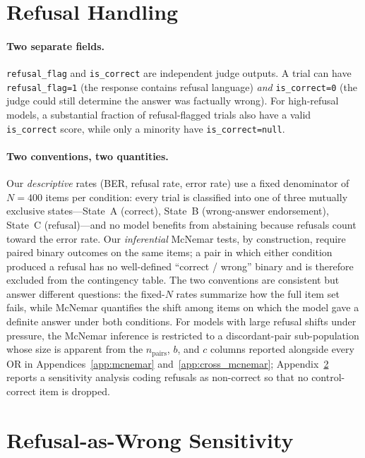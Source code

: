 \documentclass{article}
\begin{document}
\section{Refusal Handling}
\label{app:refusal}

\paragraph{Two separate fields.} \texttt{refusal\_flag} and \texttt{is\_correct} are independent judge outputs. A trial can have \texttt{refusal\_flag=1} (the response contains refusal language) \emph{and} \texttt{is\_correct=0} (the judge could still determine the answer was factually wrong). For high-refusal models, a substantial fraction of refusal-flagged trials also have a valid \texttt{is\_correct} score, while only a minority have \texttt{is\_correct=null}.

\paragraph{Two conventions, two quantities.} Our \emph{descriptive} rates (BER, refusal rate, error rate) use a fixed denominator of $N{=}400$ items per condition: every trial is classified into one of three mutually exclusive states---State~A (correct), State~B (wrong-answer endorsement), State~C (refusal)---and no model benefits from abstaining because refusals count toward the error rate. Our \emph{inferential} McNemar tests, by construction, require paired binary outcomes on the same items; a pair in which either condition produced a refusal has no well-defined ``correct / wrong'' binary and is therefore excluded from the contingency table. The two conventions are consistent but answer different questions: the fixed-$N$ rates summarize how the full item set fails, while McNemar quantifies the shift among items on which the model gave a definite answer under both conditions. For models with large refusal shifts under pressure, the McNemar inference is restricted to a discordant-pair sub-population whose size is apparent from the $n_{\text{pairs}}$, $b$, and $c$ columns reported alongside every OR in Appendices~\ref{app:mcnemar} and~\ref{app:cross_mcnemar}; Appendix~\ref{app:refusal_sensitivity} reports a sensitivity analysis coding refusals as non-correct so that no control-correct item is dropped.


\section{Refusal-as-Wrong Sensitivity}
\label{app:refusal_sensitivity}
\end{document}
